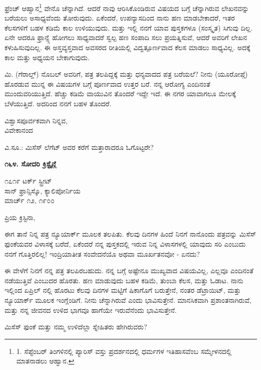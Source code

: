 ಫ್ರೆಂಚ್ ಆಹ್ವಾನ\footnote{1. ಸೆಪ್ಟೆಂಬರ್ ತಿಂಗಳಿನಲ್ಲಿ ಪ್ಯಾರಿಸ್ ವಸ್ತು ಪ್ರದರ್ಶನದಲ್ಲಿ ಧರ್ಮಗಳ ಇತಿಹಾಸವೆಂಬ ಸಮ್ಮೇಳನದಲ್ಲಿ ಮಾತನಾಡಲು ಆಹ್ವಾನ.} ವೇನೊ ಚೆನ್ನಾಗಿದೆ. ಆದರೆ ನಾವು ಆರಿಸಿಕೊಂಡಿರುವ ವಿಷಯದ ಬಗ್ಗೆ ಚೆನ್ನಾಗಿರುವ ಲೇಖನವನ್ನು ಬರೆಯಲು ಅಸಾಧ್ಯವೆಂದು ತೋರುವುದು. ಏಕೆಂದರೆ, ಉಪನ್ಯಾಸದಿಂದ ನಾನು ಹಣ ಮಾಡಬೇಕಾದರೆ, ಇತರ ಕೆಲಸಗಳಿಗೆ ಬಹಳ ಕಡಿಮೆ ಕಾಲ ಉಳಿಯುವುದು. ಮತ್ತು ಇಲ್ಲಿ ನನಗೆ ಯಾವ ಪುಸ್ತಕಗಳೂ (ಸಂಸ್ಕೃತ) ಸಿಗುವು ದಿಲ್ಲ. ಏನೇ ಆದರೂ ಫ್ರಾನ್ಸ್ಗೆ ಹೋಗಲು ಸಾಧ್ಯವಾದರೆ ಸ್ವಲ್ಪ ಹಣ ಸಂಪಾದಿ ಸಲು ಪ್ರಯತ್ನಿಸುವೆ, ಆದರೆ ಅವರಿಗೆ ಲೇಖನ ಕಳುಹಿಸುವುದಿಲ್ಲ. ಈ ಅಸ್ತವ್ಯಸ್ತವಾದ ಅವಸರದ ರೀತಿಯಲ್ಲಿ ವಿದ್ವತ್ಪೂರ್ಣವಾದ ಕೆಲಸ ಮಾಡಲು ಸಾಧ್ಯವಿಲ್ಲ. ಅದಕ್ಕೆ ಕಾಲ ಮತ್ತು ಅಧ್ಯಯನ ಬೇಕಾಗುವುದು.

ಮಿ. (ಗೆರಾಲ್ಡ್) ನೊಬಲ್ ಅವರಿಗೆ, ಪತ್ರ ತಲಪಿದ್ದಕ್ಕೆ ಮತ್ತು ಧನ್ಯವಾದದ ಪತ್ರ ಬರೆಯಲೆ? ನೀನು (ಯೂರೋಪ್ಗೆ) ಹೊರಡುವ ಮುನ್ನ ಈ ವಿಷಯಗಳ ಬಗ್ಗೆ ಪೂರ್ಣವಾದ ಉತ್ತರ ಬರೆ. ನನ್ನ ಆರೋಗ್ಯ ಎಂದಿನಂತೆ ಮುಂದುವರಿಯುತ್ತಿದೆ. ಹೆಚ್ಚು ಕಡಿಮೆ ವಾಯುವಿನ ತೊಂದರೆ ಇದ್ದೇ ಇದೆ. ಈ ನಗರ ಯಾವಾಗಲೂ ಮೇಲಕ್ಕೆ ಬೆಳೆಯುತ್ತಿದೆ. ಅದರಿಂದ ನನಗೆ ಬಹಳ ತೊಂದರೆ.

\begin{flushright}
ವಿಶ್ವಾಸಪೂರ್ವಕವಾಗಿ ನಿನ್ನವ,\\ವಿವೇಕಾನಂದ
\end{flushright}

ವಿ.ಸೂ.: ಮಿಸೆಸ್ ಲೆಗೆಟ್ ಅವರ ಕರೆಗೆ ಮತ್ತಾರಾದರೂ ಓಗೊಟ್ಟರೇ?

\begin{center}
\textbf{೧೬೪. ಸೋದರಿ ಕ್ರಿಸ್ಟೈನ್ಗೆ}
\end{center}

\begin{flushright}
೧೭೧೯ ಟರ್ಕ್ ಸ್ಟ್ರೀಟ್\\ಸಾನ್ ಫ್ರಾನ್ಸಿಸ್ಕೊ, ಕ್ಯಾಲಿಪೋರ್ನಿಯ\\ಮಾರ್ಚ್ ೧೨, ೧೯೦೦
\end{flushright}

ಪ್ರಿಯ ಕ್ರಿಸ್ಟಿನಾ,

ಈಗ ತಾನೆ ನಿನ್ನ ಪತ್ರ ನ್ಯೂಯಾರ್ಕ್ ಮೂಲಕ ತಲಪಿತು. ಕೆಲವು ದಿನಗಳ ಹಿಂದೆ ನಿನಗೆ ನಾನೊಂದು ಪತ್ರವನ್ನು ಮಿಸೆಸ್ ಫುಂಕೆಯವರ ವಿಳಾಸಕ್ಕೆ ಬರೆದೆ, ಏಕೆಂದರೆ ನನ್ನ ಪುಸ್ತಕದಲ್ಲಿ ಇರುವ ನಿನ್ನ ವಿಳಾಸಗಳಲ್ಲಿ ಯಾವುದು ಸರಿ ಎಂಬುದು ನನಗೆ ಗೊತ್ತಿರಲಿಲ್ಲ! ಇಂದ್ರಿಯಾತೀತ ಸಂವೇದನೆಯೊ ಅಥವಾ ಮೂರ್ಖತನವೋ - ಏನದು?

ಈ ವೇಳೆಗೆ ನಿನಗೆ ನನ್ನ ಪತ್ರ ತಲಪಿರಬಹುದು. ನನ್ನ ಬಗ್ಗೆ ಅಷ್ಟೇನೂ ಮುಖ್ಯವಾದ ವಿಷಯವಿಲ್ಲ, ಎಲ್ಲವೂ ಎಂದಿನಂತೆ ನಡೆಯುತ್ತಿವೆ ಎಂಬುದರ ಹೊರತು. ಹಣ ಮಾಡುವುದು ಬಹಳ ಕಡಿಮೆ, ತುಂಬಾ ಕೆಲಸ, ಮತ್ತು ಓಡಾಟ. ನಾನು ಇಲ್ಲಿಂದ ಏಪ್ರಿಲ್ ನಲ್ಲಿ ಹೊರಟು ಕೆಲವು ದಿನಗಳ ಮಟ್ಟಿಗೆ ಷಿಕಾಗೊಗೆ ಬರುತ್ತೇನೆ, ನಂತರ ಡೆಟ್ರಾಯಿಟ್, ಮತ್ತು ನ್ಯೂಯಾರ್ಕ್ ಮೂಲಕ ಇಂಗ್ಲೆಂಡಿಗೆ. ನೀನು ಚೆನ್ನಾಗಿರುವೆ ಎಂದು ಭಾವಿಸುತ್ತೇನೆ. ಮಾನಸಿಕವಾಗಿ ಪ್ರಶಾಂತನಾಗಿರುವೆ, ಮತ್ತು ನನ್ನ ಜೀವನದ ಉಳಿದ ಭಾಗವೂ ಹಾಗೆಯೇ ಇರುವೆನೆಂದು ಭಾವಿಸುತ್ತೇನೆ.

ಮಿಸೆಸ್ ಫುಂಕೆ ಮತ್ತು ನಮ್ಮ ಉಳಿದೆಲ್ಲಾ ಸ್ನೇಹಿತರು ಹೇಗಿರುವರು?

